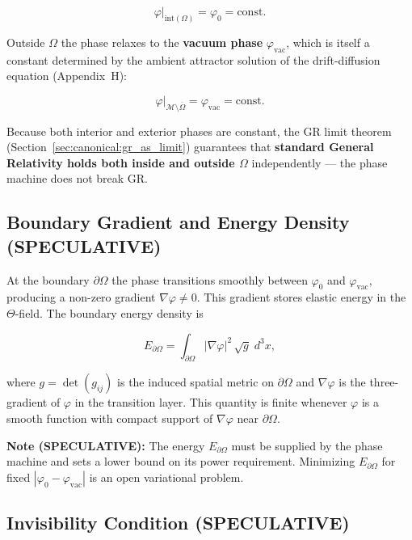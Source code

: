 \begin{equation}
\label{eq:pm_interior_phase}
\left.\varphi\right|_{\mathrm{int}(\Omega)} = \varphi_0 = \mathrm{const}.
\end{equation}

Outside $\Omega$ the phase relaxes to the \textbf{vacuum phase} $\varphi_\mathrm{vac}$,
which is itself a constant determined by the ambient attractor solution of the drift-diffusion
equation (Appendix~H):

\begin{equation}
\label{eq:pm_exterior_phase}
\left.\varphi\right|_{\mathcal{M}\setminus\overline{\Omega}} = \varphi_\mathrm{vac} = \mathrm{const}.
\end{equation}

Because both interior and exterior phases are constant, the GR limit theorem
(Section~\ref{sec:canonical:gr_as_limit}) guarantees that \textbf{standard General Relativity
holds both inside and outside $\Omega$} independently — the phase machine does not break GR.

\subsection{Boundary Gradient and Energy Density (SPECULATIVE)}

At the boundary $\partial\Omega$ the phase transitions smoothly between $\varphi_0$ and
$\varphi_\mathrm{vac}$, producing a non-zero gradient $\nabla\varphi \neq 0$.  This gradient
stores elastic energy in the $\Theta$-field.  The boundary energy density is

\begin{equation}
\label{eq:pm_boundary_energy}
E_{\partial\Omega} = \int_{\partial\Omega} |\nabla\varphi|^2\,\sqrt{g}\;d^3x,
\end{equation}

where $g = \det(g_{ij})$ is the induced spatial metric on $\partial\Omega$ and $\nabla\varphi$
is the three-gradient of $\varphi$ in the transition layer.  This quantity is finite whenever
$\varphi$ is a smooth function with compact support of $\nabla\varphi$ near $\partial\Omega$.

\textbf{Note (SPECULATIVE):}  The energy $E_{\partial\Omega}$ must be supplied by the phase
machine and sets a lower bound on its power requirement.  Minimizing $E_{\partial\Omega}$ for
fixed $|\varphi_0 - \varphi_\mathrm{vac}|$ is an open variational problem.

\subsection{Invisibility Condition (SPECULATIVE)}

